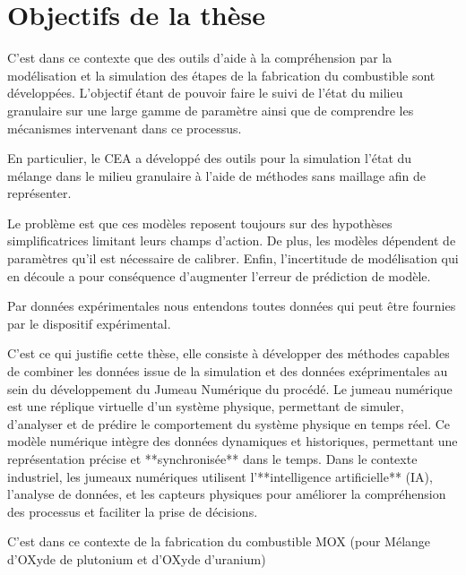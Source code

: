 \section*{Objectifs de la thèse}

C'est dans ce contexte que des outils d'aide à la compréhension par la modélisation et la simulation des étapes de la fabrication du combustible sont développées. L'objectif étant de pouvoir faire le suivi de l'état du milieu granulaire sur une large gamme de paramètre ainsi que de comprendre les mécanismes intervenant dans ce processus.

En particulier, le CEA a développé des outils pour la simulation l'état du mélange dans le milieu granulaire à l'aide de méthodes sans maillage afin de représenter.

Le problème est que ces modèles reposent toujours sur des hypothèses simplificatrices limitant leurs champs d'action. De plus, les modèles dépendent de paramètres qu'il est nécessaire de calibrer. Enfin, l'incertitude de modélisation qui en découle a pour conséquence d'augmenter l'erreur de prédiction de modèle.

Par données expérimentales nous entendons toutes données qui peut être fournies par le dispositif expérimental.

C'est ce qui justifie cette thèse, elle consiste à développer des méthodes capables de combiner les données issue de la simulation et des données exéprimentales au sein du développement du Jumeau Numérique du procédé. Le jumeau numérique est une réplique virtuelle d'un système physique, permettant de simuler, d'analyser et de prédire le comportement du système physique en temps réel. Ce modèle numérique intègre des données dynamiques et historiques, permettant une représentation précise et **synchronisée** dans le temps. Dans le contexte industriel, les jumeaux numériques utilisent l'**intelligence artificielle** (IA), l'analyse de données, et les capteurs physiques pour améliorer la compréhension des processus et faciliter la prise de décisions.


C'est dans ce contexte de la fabrication du combustible MOX (pour Mélange d’OXyde de plutonium et d’OXyde d’uranium)


